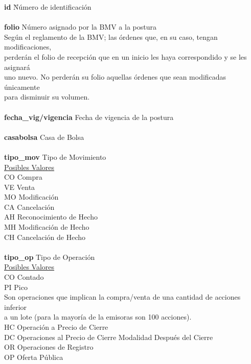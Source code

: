 \documentclass[11pt]{article}
\numberwithin{equation}{section} %
\begin{document}
\noindent
\begin{tabbing}
\textbf{id} \hspace{3cm} \= Número de identificación \hspace{1cm} \= \\
\\
\textbf{folio} \> Número asignado por la BMV a la postura\\
Según el reglamento de la BMV; las órdenes que, en su caso, tengan modificaciones,\\
perderán el folio de recepción que en un inicio les haya correspondido y se les asignará\\
uno nuevo. No perderán su folio aquellas órdenes que sean modificadas únicamente\\
para disminuir su volumen.\\
\\
\textbf{fecha\_vig/vigencia} \> Fecha de vigencia de la postura \\
\\
\textbf{casabolsa} \> Casa de Bolsa\\
\\
\textbf{tipo\_mov} \> Tipo de Movimiento\\
\underline{Posibles Valores} \\
CO \> Compra\\
VE \> Venta\\
MO \> Modificación\\
CA \> Cancelación\\
AH \> Reconocimiento de Hecho\\
MH \> Modificación de Hecho\\
CH \> Cancelación de Hecho\\
\\
\textbf{tipo\_op} \> Tipo de Operación\\
\underline{Posibles Valores} \\
CO \> Contado\\
PI \> Pico\\
Son operaciones que implican la compra/venta de una cantidad de acciones inferior\\
a un lote (para la mayoría de la emisoras son 100 acciones).\\
HC \> Operación a Precio de Cierre\\
DC \> Operaciones al Precio de Cierre Modalidad Después del Cierre\\
OR \> Operaciones de Registro\\
OP \> Oferta Pública\\

\end{tabbing}
\end{document}
